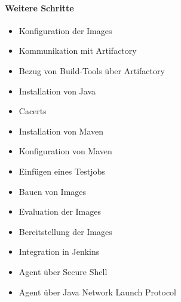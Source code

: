 \paragraph{Weitere Schritte}
\begin{itemize}
    \item Konfiguration der Images
    \item Kommunikation mit Artifactory
    \item Bezug von Build-Tools über Artifactory
    \item Installation von Java
    \item Cacerts
    \item Installation von Maven
    \item Konfiguration von Maven
    \item Einfügen eines Testjobs
    \item Bauen von Images
    \item Evaluation der Images
    \item Bereitstellung der Images
    \item Integration in Jenkins
    \item Agent über Secure Shell
    \item Agent über Java Network Launch Protocol
\end{itemize}